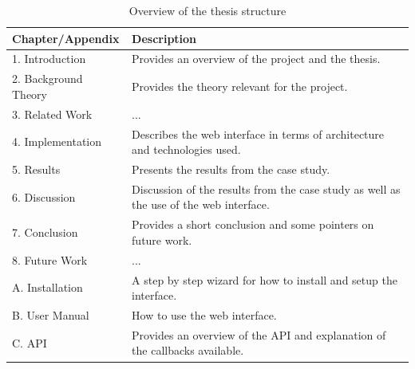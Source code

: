 \begin{table}[!h]
\begin{center}
\begin{tabular}{ | l | p{8cm} |}
\hline
\textbf{Chapter/Appendix} & \textbf{Description} \\ \hline
1. Introduction & Provides an overview of the project and the thesis. \\ \hline
2. Background Theory & Provides the theory relevant for the project. \\ \hline
3. Related Work & ... \\ \hline
4. Implementation & Describes the web interface in terms of architecture and technologies used. \\ \hline
5. Results & Presents the results from the case study. \\ \hline
6. Discussion & Discussion of the results from the case study as well as the use of the web interface. \\ \hline
7. Conclusion & Provides a short conclusion and some pointers on future work. \\ \hline
8. Future Work & ... \\ \hline
A. Installation & A step by step wizard for how to install and setup the interface. \\ \hline
B. User Manual & How to use the web interface. \\ \hline
C. API & Provides an overview of the API and explanation of the callbacks available. \\ \hline
\end{tabular}
\end{center}
\caption{Overview of the thesis structure}
\label{tab:1}
\end{table}

\cleardoublepage